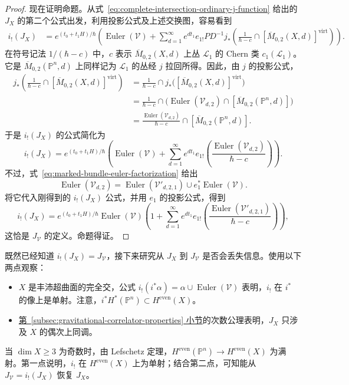 \begin{proof}
现在证明命题。从式~\eqref{eq:complete-intersection-ordinary-j-function} 给出的 $J_X$ 的第二个公式出发，利用投影公式及上述交换图，容易看到
\[
\begin{aligned}
i_!(J_X)&=e^{(t_0+t_1H)/\hbar}\left(\operatorname{Euler}(\mathcal V)+\sum_{d=1}^{\infty}e^{dt_1}
 e_{1!}PD^{-1}j_*\left(\frac1{\hbar-c}\cap[\overline M_{0,2}(X,d)]^{\mathrm{virt}}\right)\right).
\end{aligned}
\]
在符号记法 $1/(\hbar-c)$ 中，$c$ 表示 $\overline M_{0,2}(X,d)$ 上丛 $\mathcal L_1$ 的 Chern 类 $c_1(\mathcal L_1)$。它是 $\overline M_{0,2}(\mathbb P^n,d)$ 上同样记为 $\mathcal L_1$ 的丛经 $j$ 拉回所得。因此，由 $j$ 的投影公式，
\[
\begin{aligned}
j_*\left(\frac1{\hbar-c}\cap[\overline M_{0,2}(X,d)]^{\mathrm{virt}}\right)
&=\frac1{\hbar-c}\cap j_*\bigl([\overline M_{0,2}(X,d)]^{\mathrm{virt}}\bigr)\\
&=\frac1{\hbar-c}\cap\bigl(\operatorname{Euler}(\mathcal V_{d,2})\cap[\overline M_{0,2}(\mathbb P^n,d)]\bigr)\\
&=\frac{\operatorname{Euler}(\mathcal V_{d,2})}{\hbar-c}\cap[\overline M_{0,2}(\mathbb P^n,d)].
\end{aligned}
\]
于是 $i_!(J_X)$ 的公式简化为
\[
i_!(J_X)=e^{(t_0+t_1H)/\hbar}
\left(\operatorname{Euler}(\mathcal V)+\sum_{d=1}^{\infty}e^{dt_1}
 e_{1!}\left(\frac{\operatorname{Euler}(\mathcal V_{d,2})}{\hbar-c}\right)\right).
\]
不过，式~\eqref{eq:marked-bundle-euler-factorization} 给出
\[
\operatorname{Euler}(\mathcal V_{d,2})
=\operatorname{Euler}(\mathcal V'_{d,2,1})\cup e_1^*\operatorname{Euler}(\mathcal V).
\]
将它代入刚得到的 $i_!(J_X)$ 公式，并用 $e_1$ 的投影公式，得到
\[
i_!(J_X)=e^{(t_0+t_1H)/\hbar}\operatorname{Euler}(\mathcal V)
\left(1+\sum_{d=1}^{\infty}e^{dt_1}e_{1!}
\left(\frac{\operatorname{Euler}(\mathcal V'_{d,2,1})}{\hbar-c}\right)\right),
\]
这恰是 $J_{\mathcal V}$ 的定义。命题得证。
\end{proof}

既然已经知道 $i_!(J_X)=J_{\mathcal V}$，接下来研究从 $J_X$ 到 $J_{\mathcal V}$ 是否会丢失信息。使用以下两点观察：
\begin{itemize}
\item $X$ 是丰沛超曲面的完全交，公式 $i_!(i^*\alpha)=\alpha\cup\operatorname{Euler}(\mathcal V)$ 表明，$i_!$ 在 $i^*$ 的像上是单射。注意，$i^*H^*(\mathbb P^n)\subset H^{\mathrm{even}}(X)$。
\item \hyperref[subsec:gravitational-correlator-properties]{第~\ref*{subsec:gravitational-correlator-properties} 小节}的次数公理表明，$J_X$ 只涉及 $X$ 的偶次上同调。
\end{itemize}
当 $\dim X\ge3$ 为奇数时，由 Lefschetz 定理，$H^{\mathrm{even}}(\mathbb P^n)\to H^{\mathrm{even}}(X)$ 为满射。第一点说明，$i_!$ 在 $H^{\mathrm{even}}(X)$ 上为单射；结合第二点，可知能从 $J_{\mathcal V}=i_!(J_X)$ 恢复 $J_X$。

